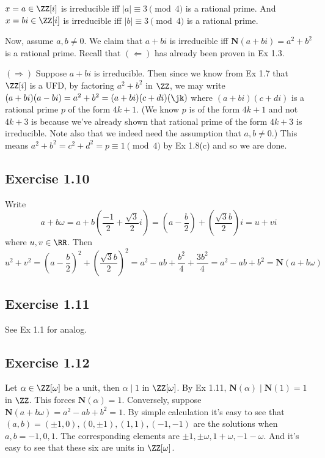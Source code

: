 \documentclass[../Chapter.tex]{subfiles}
\begin{document}
$x=a\in\ZZ[i]$ is irreducible iff $|a|\equiv 3\pmod{4}$ is a rational prime. And $x=bi\in\ZZ[i]$ is irreducible iff $|b|\equiv 3\pmod{4}$ is a rational prime.

Now, assume $a,b\neq 0$. We claim that $a+bi$ is irreducible iff $\mathbf{N}(a+bi)=a^2+b^2$ is a rational prime. Recall that $(\Leftarrow)$ has already been proven in Ex 1.3.

$(\Rightarrow)$ Suppose $a+bi$ is irreducible. Then since we know from Ex 1.7 that $\ZZ[i]$ is a UFD, by factoring $a^2+b^2$ in $\ZZ$, we may write $(a+bi)(a-bi)=a^2+b^2=(a+bi)(c+di)(\jk)$ where $(a+bi)(c+di)$ is a rational prime $p$ of the form $4k+1$. (We know $p$ is of the form $4k+1$ and not $4k+3$ is because we've already shown that rational prime of the form $4k+3$ is irreducible. Note also that we indeed need the assumption that $a,b\neq 0$.) This means $a^2+b^2=c^2+d^2=p\equiv1\pmod{4}$ by Ex 1.8(c) and so we are done.

\subsection*{Exercise 1.10}

Write $$a+b\omega=a+b\left(\frac{-1}{2}+\frac{\sqrt{3}}{2}i\right)=\left(a-\frac{b}{2}\right)+\left(\frac{\sqrt{3}b}{2}\right)i=u+vi$$ where $u,v\in\RR$. Then $$u^2+v^2=\left(a-\frac{b}{2}\right)^2+\left(\frac{\sqrt{3}b}{2}\right)^2=a^2-ab+\frac{b^2}{4}+\frac{3b^2}{4}=a^2-ab+b^2=\mathbf{N}(a+b\omega)$$

\subsection*{Exercise 1.11}

See Ex 1.1 for analog.

\subsection*{Exercise 1.12}

Let $\alpha\in\ZZ[\omega]$ be a unit, then $\alpha\mid 1$ in $\ZZ[\omega]$. By Ex 1.11, $\mathbf{N}(\alpha)\mid \mathbf{N}(1)=1$ in $\ZZ$. This forces $\mathbf{N}(\alpha)=1$. Conversely, suppose $\mathbf{N}(a+b\omega)=a^2-ab+b^2=1$. By simple calculation it's easy to see that $(a,b)=(\pm1,0),(0,\pm1),(1,1),(-1,-1)$ are the solutions when $a,b=-1,0,1$. The corresponding elements are $\pm1,\pm\omega,1+\omega,-1-\omega$. And it's easy to see that these six are units in $\ZZ[\omega]$.
\end{document}
